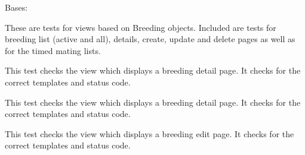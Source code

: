 \documentclass[letterpaper,10pt,english]{sphinxmanual}
\begin{document}
\begin{fulllineitems}
\label{api:animal.tests.BreedingViewTests}
Bases: 

These are tests for views based on Breeding objects.  Included are tests for breeding list (active and all), details, create, update and delete pages as well as for the timed mating lists.


\begin{fulllineitems}
\label{api:animal.tests.BreedingViewTests.setUp}
\end{fulllineitems}



\begin{fulllineitems}
\label{api:animal.tests.BreedingViewTests.tearDown}
\end{fulllineitems}



\begin{fulllineitems}
\label{api:animal.tests.BreedingViewTests.test_breeding_delete}
This test checks the view which displays a breeding detail page.  It checks for the correct templates and status code.

\end{fulllineitems}



\begin{fulllineitems}
\label{api:animal.tests.BreedingViewTests.test_breeding_detail}
This test checks the view which displays a breeding detail page.  It checks for the correct templates and status code.

\end{fulllineitems}



\begin{fulllineitems}
\label{api:animal.tests.BreedingViewTests.test_breeding_edit}
This test checks the view which displays a breeding edit page.  It checks for the correct templates and status code.


\end{fulllineitems}
\end{fulllineitems}
\end{document}

